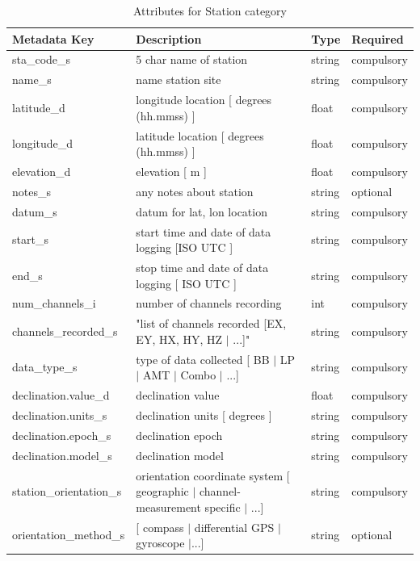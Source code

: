 \documentclass{article}
\begin{document}
\begin{table}[htb!]
	\caption[Attributes for Station]{Attributes for Station category}
	\begin{tabular}{|l|p{3in}|l|l|}
		\hline
		\textbf{Metadata Key} & \textbf{Description} & \textbf{Type} & \textbf{Required} \\ \hline
		sta\_code\_s & 5 char name of station & string & compulsory \\ \hline
		name\_s & name station site & string & compulsory \\ \hline
		latitude\_d & longitude location [ degrees (hh.mmss) ] & float & compulsory \\ \hline
		longitude\_d & latitude location [ degrees (hh.mmss) ] & float & compulsory \\ \hline
		elevation\_d & elevation [ m ] & float & compulsory \\ \hline
		notes\_s & any notes about station & string & optional \\ \hline
		datum\_s & datum for lat, lon location & string & compulsory \\ \hline
		start\_s & start time and date of data logging [ISO UTC ] & string & compulsory \\ \hline
		end\_s & stop time and date of data logging  [ ISO UTC ] & string & compulsory \\ \hline
		num\_channels\_i & number of channels recording & int & compulsory \\ \hline
		channels\_recorded\_s & "list of channels recorded [EX, EY, HX, HY, HZ $|$ ...]" & string & compulsory \\ \hline
		data\_type\_s & type of data collected [ BB $|$ LP $|$ AMT $|$ Combo $|$ ...] & string & compulsory \\ \hline
		declination.value\_d & declination value & float & compulsory \\ \hline
		declination.units\_s & declination units [ degrees ] & string & compulsory \\ \hline
		declination.epoch\_s & declination epoch & string & compulsory \\ \hline
		declination.model\_s & declination model & string & compulsory \\ \hline
		station\_orientation\_s & orientation coordinate system [ geographic $|$ channel-measurement specific $|$ ...] & string & compulsory \\ \hline
		orientation\_method\_s & [ compass $|$ differential GPS $|$ gyroscope $|$...] & string & optional \\ \hline

\end{tabular}
\end{table}
\end{document}
